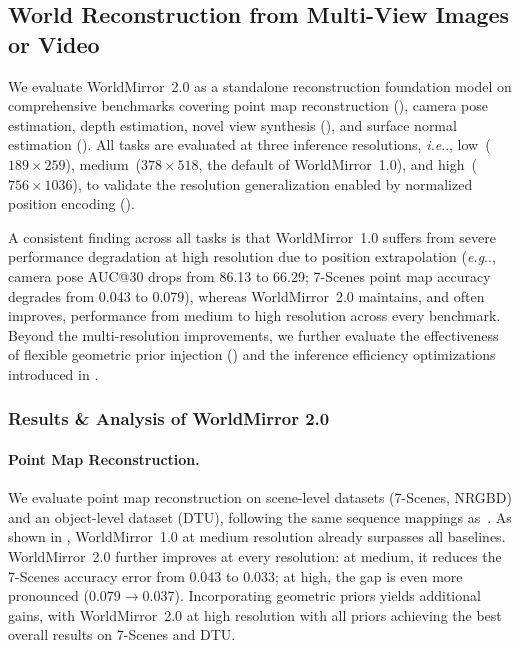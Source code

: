 \documentclass{article} %
\makeatletter
\DeclareRobustCommand\onedot{\futurelet\@let@token\@onedot}
\def\@onedot{\ifx\@let@token.\else.\null\fi\xspace}
\def\eg{\emph{e.g}\onedot} \def\Eg{\emph{E.g}\onedot}
\def\ie{\emph{i.e}\onedot} \def\Ie{\emph{I.e}\onedot}
\makeatother
\begin{document}
\subsection{World Reconstruction from Multi-View Images or Video}
\label{sec:recon_experiments}

We evaluate WorldMirror~2.0 as a standalone reconstruction foundation model on comprehensive benchmarks covering point map reconstruction (), camera pose estimation, depth estimation, novel view synthesis (), and surface normal estimation (). All tasks are evaluated at three inference resolutions, \ie, low~($189\!\times\!259$), medium~($378\!\times\!518$, the default of WorldMirror~1.0), and high~($756\!\times\!1036$), to validate the resolution generalization enabled by normalized position encoding ().

A consistent finding across all tasks is that WorldMirror~1.0 suffers from severe performance degradation at high resolution due to position extrapolation (\eg, camera pose AUC@30 drops from 86.13 to 66.29; 7-Scenes point map accuracy degrades from 0.043 to 0.079), whereas WorldMirror~2.0 maintains, and often improves, performance from medium to high resolution across every benchmark. Beyond the multi-resolution improvements, we further evaluate the effectiveness of flexible geometric prior injection () and the inference efficiency optimizations introduced in .

\subsubsection{Results \& Analysis of WorldMirror 2.0}

\paragraph{Point Map Reconstruction.}
We evaluate point map reconstruction on scene-level datasets (7-Scenes, NRGBD) and an object-level dataset (DTU), following the same sequence mappings as~\cite{wang2025pi}. As shown in , WorldMirror~1.0 at medium resolution already surpasses all baselines. WorldMirror~2.0 further improves at every resolution: at medium, it reduces the 7-Scenes accuracy error from 0.043 to 0.033; at high, the gap is even more pronounced (0.079$\to$0.037). Incorporating geometric priors yields additional gains, with WorldMirror~2.0 at high resolution with all priors achieving the best overall results on 7-Scenes and DTU.
\end{document}
